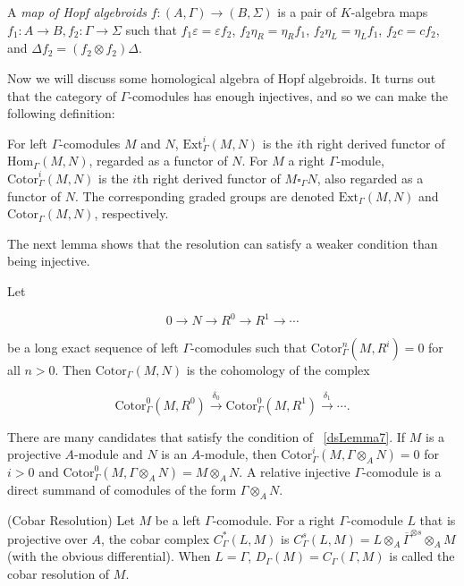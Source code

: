 \begin{definition} A \textit{map of Hopf algebroids} $ f: (A, \Gamma) \to (B, \Sigma)$ is a pair of $ K$-algebra maps $ f_1: A \to B, f_2: \Gamma \to \Sigma$ such that $ f_1\varepsilon = \varepsilon f_2$, $ f_2 \eta_R = \eta_R f_1$, $ f_2 \eta_L = \eta_L f_1$, $ f_2 c = cf_2$, and $ \Delta f_2 = (f_2 \otimes f_2) \Delta$.
\end{definition}

Now we will discuss some homological algebra of Hopf algebroids.  It turns out that the category of $ \Gamma$-comodules has enough injectives, and so we can make the following definition:

\begin{definition}
 For left $ \Gamma$-comodules $ M$ and $ N$, $ \text{Ext}_{\Gamma}^i (M, N)$ is the $ i$th right derived functor of $ \text{Hom}_{\Gamma}(M, N)$, regarded as a functor of $ N$.  For $ M$ a right $ \Gamma$-module, $ \text{Cotor}_{\Gamma}^i (M, N)$ is the $ i$th right derived functor of $ M \square_{\Gamma} N$, also regarded as a functor of $ N$.  The corresponding graded groups are denoted $ \text{Ext}_{\Gamma}(M, N)$ and $ \text{Cotor}_{\Gamma}(M, N)$, respectively.
 \end{definition}

The next lemma shows that the resolution can satisfy a weaker condition than being injective.

\begin{lemma}\label{dsLemma7} Let

$$ 0 \rightarrow N \rightarrow R^0 \rightarrow R^1 \rightarrow \cdots$$

be a long exact sequence of left $ \Gamma$-comodules such that $ \text{Cotor}_{\Gamma}^n(M, R^i) = 0$ for all $ n > 0$.  Then $ \text{Cotor}_{\Gamma}(M, N)$ is the cohomology of the complex

$$ \text{Cotor}_{\Gamma}^0 (M, R^0) \stackrel{\delta_0}{\longrightarrow} \text{Cotor}_{\Gamma}^0 (M, R^1) \stackrel{\delta_1}{\longrightarrow} \cdots.$$
\end{lemma}

There are many candidates that satisfy the condition of ~\ref{dsLemma7}.  If $ M$ is a projective $ A$-module and $ N$ is an $ A$-module, then $ \text{Cotor}_{\Gamma}^i (M, \Gamma \otimes_A N) = 0$ for $ i > 0$ and $ \text{Cotor}_{\Gamma}^0 (M, \Gamma \otimes_A N) = M \otimes_A N$.  A relative injective $ \Gamma$-comodule is a direct summand of comodules of the form $ \Gamma \otimes_A N$.

\begin{definition}
 (Cobar Resolution) Let $ M$ be a left $ \Gamma$-comodule.  For a right $ \Gamma$-comodule $ L$ that is projective over $ A$, the cobar complex $ C_{\Gamma}^*(L, M)$ is $ C_{\Gamma}^s(L, M) = L \otimes_A \overline{\Gamma}^{\otimes s} \otimes_A M$ (with the obvious differential).  When $ L = \Gamma$, $ D_{\Gamma}(M) = C_{\Gamma}(\Gamma, M)$ is called the cobar resolution of $ M$.
 \end{definition}

